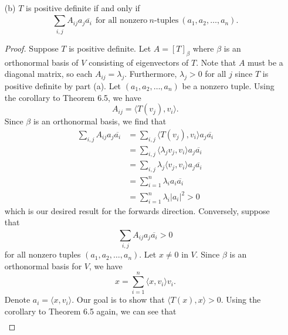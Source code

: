 \begin{enumerate}
\begin{proof}
        \end{proof}
    \item[(b)] \( T  \) is positive definite if and only if 
        \[ \sum_{ i,j }^{  } {A}_{ij} {a}_{j} \overline{{a}_{i} } \ \ \text{for all nonzero} \ n  \text{-tuples} \  ({a}_{1}, {a}_{2}, \dots, {a}_{n}).  \]
        \begin{proof}
        Suppose \( T  \) is positive definite. Let \( A = [T]_{\beta} \) where \( \beta  \) is an orthonormal basis of \( V  \) consisting of eigenvectors of \( T  \). Note that \( A  \) must be a diagonal matrix, so each \( {A}_{ij} = {\lambda}_{j} \). Furthermore, \( \lambda_j > 0  \) for all \( j  \) since \( T  \) is positive definite by part (a). Let \( ({a}_{1}, {a}_{2}, \dots, {a}_{n}) \) be a nonzero tuple. Using the corollary to Theorem 6.5, we have 
        \[  {A}_{ij} = \langle T({v}_{j}) , {v}_{i} \rangle. \]
        Since \( \beta  \) is an orthonormal basis, we find that
        \begin{align*}
           \sum_{ i,j }^{  } {A}_{ij} {a}_{j} \overline{{a}_{i}} &= \sum_{ i,j }^{  } \langle T({v}_{j}) , {v}_{i}  \rangle {a}_{j} \overline{{a}_{i}} \\
                                                                 &= \sum_{ i,j  }^{  } \langle {\lambda}_{j} {v}_{j} , {v}_{i}  \rangle {a}_{j} \overline{{a}_{i}} \\
                                                                 &= \sum_{ i,j  }^{  } {\lambda}_{j} \langle {v}_{j} , {v}_{i} \rangle {a}_{j} \overline{{a}_{i}} \\
                                                                 &= \sum_{ i=1  }^{ n } {\lambda}_{i} {a}_{i} \overline{{a}_{i}} \\ 
                                                                 &= \sum_{ i=1  }^{ n } {\lambda}_{i} | {a}_{i} |^{2} > 0
        \end{align*}
        which is our desired result for the forwards direction. Conversely, suppose that 
        \[ \sum_{ i,j }^{  } {A}_{ij} {a}_{j} \overline{{a}_{i}} > 0   \]
        for all nonzero tuples \( ({a}_{1}, {a}_{2}, \dots, {a}_{n})  \). Let \( x \neq 0  \) in \( V  \). Since \( \beta  \) is an orthonormal basis for \( V  \), we have 
        \[  x = \sum_{ i=1  }^{ n } \langle x , {v}_{i} \rangle {v}_{i}. \]
        Denote \( {a}_{i} = \langle x  , {v}_{i}  \rangle \). Our goal is to show that \( \langle T(x) , x \rangle > 0  \). Using the corollary to Theorem 6.5 again, we can see that
        \begin{align*}

\end{align*}
\end{proof}
\end{enumerate}
